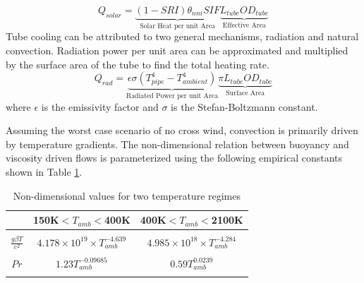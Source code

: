 \documentclass[heading.tex]{subfiles}
\begin{document}

\begin{equation}
Q_{solar} = \underbrace{ (1-SRI)  {\theta}_{nni}  SIF}_\text{Solar Heat per unit Area} \underbrace{L_{tube}  OD_{tube}}_\text{Effective Area}
\end{equation}
Tube cooling can be attributed to two general mechanisms, radiation and natural convection. Radiation power per unit area can be
approximated and multiplied by the surface area of the tube to find the total heating rate.
\begin{equation}
Q_{rad} = \underbrace{\epsilon \sigma (T_{pipe}^4 - T_{ambient}^4)}_\text{Radiated Power per unit Area}\underbrace{\pi L_{tube} OD_{tube}}_\text{Surface Area}
\end{equation}
where  $\epsilon$ is the emissivity factor and  $\sigma$ is the Stefan-Boltzmann constant.

Assuming the worst case scenario of no cross wind, convection is primarily driven by temperature gradients. The non-dimensional relation
between buoyancy and viscosity driven flows is parameterized using the following empirical constants shown in Table \ref{tab:NonDim}. \cite{Berton} \cite{Incropera}


\begin{table}
    \centering
    \caption{Non-dimensional values for two temperature regimes}
    \label{tab:NonDim}
    \begin{tabular}{ c  |  c |  c} 
        \hline
        & 150K$<T_{amb}<$400K & 400K$< T_{amb}<$2100K \\ \hline 
        &&\\
       $\frac{g \beta T} {\upsilon^2} $ & $4.178\times10^{19} \times T_{amb}^{-4.639}$ & $4.985\times10^{18} \times T_{amb}^{-4.284}$\\
       &&\\ 
        $Pr $ & $1.23 T_{amb}^{-0.09685}$ & $0.59 T_{amb}^{0.0239}$ \\
        &&\\  \hline
    \end{tabular}
\end{table}
\end{document}

